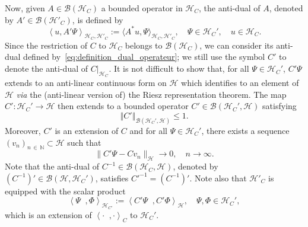 \documentclass[10pt]{amsart}
\theoremstyle{definition}\newtheorem{defi}[theo]{Definition}\newtheorem{rema}[theo]{Remark}\newtheorem{exam}[theo]{Example}\newtheorem{exem}[theo]{Example}\newtheorem{nota}[theo]{Notation}
\newcommand{\Hi}{\mathcal{H}}
\newcommand{\N}{\mathbb{N}}
\newcommand{\norme}[1]{\left\Vert #1\right\Vert}
\newcommand{\scal}[2]{\left\langle{#1} \middle., {#2}\right\rangle}
\newcommand{\clB}{\mathcal{B}}
\begin{document}
Now, given $A\in\clB(\Hi_C)$ a bounded operator in $\Hi_C$, the anti-dual of $A$, denoted by $A'\in\clB(\Hi'_C)$, is defined by
\begin{equation}\label{eq:definition_dual_operateur}
\left\langle u, A'\Psi \right\rangle_{\Hi_C,\Hi'_C}:=\langle A^* u,\Psi\rangle_{\Hi_C,\Hi'_C}, \quad \Psi\in\Hi_C', \quad u\in\Hi_C.
\end{equation}
Since the restriction of $C$ to $\Hi_C$ belongs to $\clB(\Hi_C)$, we can consider its anti-dual defined by~\eqref{eq:definition_dual_operateur}; we still use the symbol $C'$ to denote the anti-dual of $C|_{\Hi_C}$. It is not difficult to show that, for all $\Psi\in\Hi_C'$, $C'\Psi$ extends to an anti-linear continuous form on $\Hi$ which identifies to an element of $\Hi$ \emph{via} the (anti-linear version of) the Riesz representation theorem. The map $C':\Hi_C'\to\Hi$ then extends to a bounded operator $C'\in\clB(\Hi_C',\Hi)$ satisfying
\begin{equation*}
\norme{C'}_{\clB(\Hi_C',\Hi)}\leq 1.
\end{equation*}
Moreover, $C'$ is an extension of $C$ and for all $\Psi\in\Hi_C'$, there exists a sequence $(v_n)_{n\,\in\,\N}\subset \Hi$ such that
\begin{equation*}
\big \|C'\Psi - Cv_n \big \|_\Hi \to 0, \quad n \to \infty.
\end{equation*}
Note that the anti-dual of $C^{-1}\in\clB(\Hi_C,\Hi)$, denoted by $(C^{-1})'\in\clB(\Hi,\Hi_C')$, satisfies $C'^{-1}=(C^{-1})'$. Note also that $\Hi'_C$ is equipped with the scalar product
\begin{equation*}
\scal{\Psi}{\Phi}_{\Hi_{C'}}:=\scal{C'\Psi}{C'\Phi}_\Hi, \quad \Psi,\Phi\in\Hi_C',
\end{equation*}
which is an extension of $\scal{\cdot}{\cdot}_C$ to $\Hi_C'$.
\end{document}

